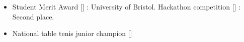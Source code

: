 %
\begin{itemize}%
    \setlength\itemsep{2em} %
    \iftrue%
    \item {}%
    \begin{itemize}%
        \iftrue%
        {Student Merit Award}%
        []%
        : University of Bristol.%
        \fi%
        \iftrue%
        {Hackathon competition}%
        []%
        : Second place.%
        \fi%
%
    \end{itemize}%
    \fi%
\end{itemize}%
%
\begin{itemize}%
    \setlength\itemsep{2em} %
    \iftrue%
    \item {}%
    \begin{itemize}%
        \iftrue%
        {National table tenis junior champion}%
        []%
        \fi%
%
    \end{itemize}%
    \fi%
\end{itemize}%